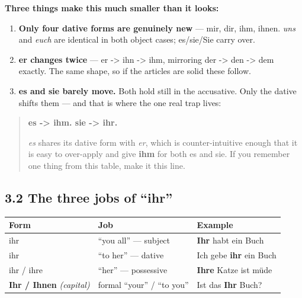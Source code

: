 \documentclass[
  11pt,
]{article}
\newcounter{none} %
\providecommand{\tightlist}{%
  \setlength{\itemsep}{0pt}\setlength{\parskip}{0pt}}
\begin{document}
\textbf{Three things make this much smaller than it looks:}

\begin{enumerate}
\def\labelenumi{\arabic{enumi}.}
\tightlist
\item
  \textbf{Only four dative forms are genuinely new} --- mir, dir, ihm,
  ihnen. \emph{uns} and \emph{euch} are identical in both object cases;
  es/sie/Sie carry over.
\item
  \textbf{er changes twice} --- er -\textgreater{} ihn -\textgreater{}
  ihm, mirroring der -\textgreater{} den -\textgreater{} dem exactly.
  The same shape, so if the articles are solid these follow.
\item
  \textbf{es and sie barely move.} Both hold still in the accusative.
  Only the dative shifts them --- and that is where the one real trap
  lives:
\end{enumerate}

\begin{quote}
\textbf{es -\textgreater{} ihm. sie -\textgreater{} ihr.}

\emph{es} shares its dative form with \emph{er}, which is
counter-intuitive enough that it is easy to over-apply and give
\textbf{ihm} for both es and sie. If you remember one thing from this
table, make it this line.
\end{quote}

\subsection{3.2 The three jobs of ``ihr''}\label{the-three-jobs-of-ihr}

{\def\LTcaptype{none} %
\begin{longtable}[]{@{}
  >{\raggedright\arraybackslash}p{}
  >{\raggedright\arraybackslash}p{}
  >{\raggedright\arraybackslash}p{}@{}}
\toprule\noalign{}
\begin{minipage}[b]{\linewidth}\raggedright
Form
\end{minipage} & \begin{minipage}[b]{\linewidth}\raggedright
Job
\end{minipage} & \begin{minipage}[b]{\linewidth}\raggedright
Example
\end{minipage} \\
\midrule\noalign{}
\endhead
\bottomrule\noalign{}
\endlastfoot
ihr & ``you all'' --- subject & \textbf{Ihr} habt ein Buch \\
ihr & ``to her'' --- dative & Ich gebe \textbf{ihr} ein Buch \\
ihr / ihre & ``her'' --- possessive & \textbf{Ihre} Katze ist müde \\
\textbf{Ihr / Ihnen} \emph{(capital)} & formal ``your'' / ``to you'' &
Ist das \textbf{Ihr} Buch? \\
\end{longtable}
}
\end{document}
